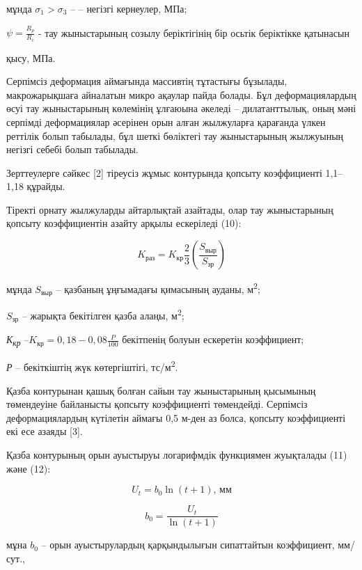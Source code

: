 \begin{multicols}{2}
мұнда \(\sigma_{1} > \sigma_{3}\) -- -- негізгі кернеулер, МПа;

\(\psi = \frac{R_{p}}{R_{c}}\) - тау жыныстарының созылу беріктігінің
бір осьтік беріктікке қатынасын

қысу, МПа.

Серпімсіз деформация аймағында массивтің тұтастығы бұзылады,
макрожарықшаға айналатын микро ақаулар пайда болады. Бұл
деформациялардың өсуі тау жыныстарының көлемінің ұлғаюына әкеледі --
дилатанттылық, оның мәні серпімді деформациялар әсерінен орын алған
жылжуларға қарағанда үлкен реттілік болып табылады, бұл шеткі бөліктегі
тау жыныстарының жылжуының негізгі себебі болып табылады.

Зерттеулерге сәйкес {[}2{]} тіреусіз жұмыс контурында қопсыту
коэффициенті 1,1--1,18 құрайды.

Тіректі орнату жылжуларды айтарлықтай азайтады, олар тау жыныстарының
қопсыту коэффициентін азайту арқылы ескеріледі (10):

\begin{equation}
K_{\text{раз}} = K_{\text{кр}}\frac{2}{3}(\frac{S_{\text{выр}}}{S_{\text{зр}}})
\end{equation}

мұнда \(S_{\text{выр}}\) -- қазбаның ұңғымадағы қимасының ауданы,
м\textsuperscript{2};

\(S_{\text{зр}}\) -- жарықта бекітілген қазба алаңы, м\textsuperscript{2};

\emph{К\textsubscript{кр}} --\(K_{\text{кр}} = 0,18 - 0,08\frac{P}{100}\)
бекітпенің болуын ескеретін коэффициент;

\emph{Р} -- бекіткіштің жүк көтергіштігі, тс/м\textsuperscript{2}.

Қазба контурынан қашық болған сайын тау жыныстарының қысымының
төмендеуіне байланысты қопсыту коэффициенті төмендейді. Серпімсіз
деформациялардың күтілетін аймағы 0,5 м-ден аз болса, қопсыту
коэффициенті екі есе азаяды {[}3{]}.

Қазба контурының орын ауыстыруы логарифмдік функциямен жуықталады (11)
және (12):

\begin{equation}
U_{t} = b_{0}\ln(t + 1)\text{, мм}
\end{equation}

\begin{equation}
b_{0} = \frac{U_{t}}{\ln(t + 1)}
\end{equation}

мұна \(b_{0}\) -- орын ауыстырулардың қарқындылығын сипаттайтын
коэффициент, мм/сут.,


\end{multicols}
